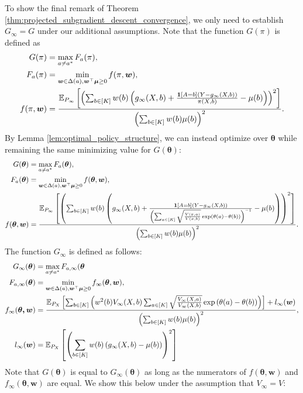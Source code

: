 \documentclass{article}
\begin{document}
\begin{appendices}
To show the final remark of Theorem \ref{thm:projected_subgradient_descent_convergence}, we only need to establish $G_\infty = G$ under our additional assumptions. Note that the function $G(\pi)$ is defined as 
\begin{align}
    G(\pi) &= \max_{a \neq a^*}F_a(\pi),\\
    F_a(\pi) &= \min_{\boldsymbol{w} \in \Delta(a), \boldsymbol{w}^\top \boldsymbol{\mu} \geq 0} f(\pi, \boldsymbol{w}), \\
    f(\pi, \boldsymbol{w}) &= \frac{\mathbb{E}_{P_\infty}\left[\left( \sum_{b \in [K]} w(b)\left(g_\infty(X,b) + \frac{\mathbf{1}[A=b](Y - g_\infty(X,b))}{\pi(X,b)} -\mu(b)\right) \right)^2 \right]}{\left(\sum_{b \in [K]} w(b) \mu(b)\right)^2}.
\end{align}
By Lemma \ref{lem:optimal_policy_structure}, we can instead optimize over $\bm{\theta}$ while remaining the same minimizing value for $G(\bm\theta)$:
\begin{align}
    G(\boldsymbol\theta) &= \max_{a \neq a^*}F_a(\boldsymbol\theta),\\
    F_a(\boldsymbol\theta) &= \min_{\boldsymbol{w} \in \Delta(a), \boldsymbol{w}^\top \boldsymbol{\mu} \geq 0} f(\boldsymbol\theta, \boldsymbol{w}), \\
    f(\boldsymbol\theta, \boldsymbol{w}) &= \frac{\mathbb{E}_{P_\infty}\left[\left( \sum_{b \in [K]} w(b)\left(g_\infty(X,b) + \frac{{\mathbf{1}[A=b](Y - g_\infty(X,b))}}{\left(\sum_{a \in [K]} \sqrt{\frac{{V(x,a)}}{{V(x,b)}}} \exp(\theta(a) - \theta(b))\right)^{-1}} -\mu(b)\right) \right)^2 \right]}{\left(\sum_{b \in [K]} w(b) \mu(b)\right)^2}.
\end{align}
The function $G_\infty$ is defined as follows:
\begin{align}
    G_\infty(\boldsymbol{\theta})&= \max_{a \neq a^*} F_{a, \infty}(\boldsymbol{\theta}\\
    F_{a,\infty}(\boldsymbol{\theta}) &= \min_{\boldsymbol{w} \in \Delta(a), \boldsymbol{w}^\top \boldsymbol{\mu} \geq 0} f_{\infty}(\boldsymbol\theta, \boldsymbol{w}), \\
        f_\infty(\boldsymbol{\theta, \boldsymbol{w}}) &= \frac{\mathbb{E}_{P_X}\left[ \sum_{b \in [K]} \left(w^2(b) V_\infty(X,b) \sum_{a \in [K]}\sqrt{\frac{V_\infty(X,a)}{V_\infty(X,b)}}\exp\left(\theta(a) - \theta(b)\right)\right) \right] + l_\infty(\boldsymbol{w})}{\left(\sum_{b \in [K]}w(b)\mu(b) \right)^2}, \\
        l_\infty(\boldsymbol{w}) &= {\mathbb{E}_{P_X}\left[ \left(\sum_{b \in [K]} w(b)\left(g_\infty(X, b) - \mu(b) \right) \right)^2 \right]}
\end{align}
Note that $G(\bm\theta)$ is equal to $G_\infty(\bm{\theta})$ as long as the numerators of $f(\bm{\theta}, \bm{w})$ and $f_\infty(\bm\theta, \bm{w})$ are equal. We show this below under the assumption that $V_\infty = V$:

\end{appendices}
\end{document}
